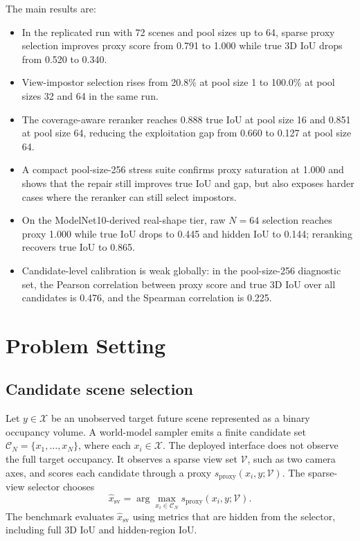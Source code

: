 \documentclass{article}
\newcommand{\vox}{\mathcal{X}}
\newcommand{\views}{\mathcal{V}}
\newcommand{\cand}{\mathcal{C}}
\begin{document}
The main results are:
\begin{itemize}
  \item In the replicated run with 72 scenes and pool sizes up to 64, sparse
  proxy selection improves proxy score from 0.791 to 1.000 while true 3D IoU
  drops from 0.520 to 0.340.
  \item View-impostor selection rises from 20.8\% at pool size 1 to 100.0\% at
  pool sizes 32 and 64 in the same run.
  \item The coverage-aware reranker reaches 0.888 true IoU at pool size 16 and
  0.851 at pool size 64, reducing the exploitation gap from 0.660 to 0.127 at
  pool size 64.
  \item A compact pool-size-256 stress suite confirms proxy saturation at 1.000
  and shows that the repair still improves true IoU and gap, but also exposes
  harder cases where the reranker can still select impostors.
  \item On the ModelNet10-derived real-shape tier, raw $N=64$ selection reaches
  proxy 1.000 while true IoU drops to 0.445 and hidden IoU to 0.144; reranking
  recovers true IoU to 0.865.
  \item Candidate-level calibration is weak globally: in the pool-size-256
  diagnostic set, the Pearson correlation between proxy score and true 3D IoU
  over all candidates is 0.476, and the Spearman correlation is 0.225.
\end{itemize}

\section{Problem Setting}

\subsection{Candidate scene selection}

Let $y \in \vox$ be an unobserved target future scene represented as a binary
occupancy volume. A world-model sampler emits a finite candidate set
$\cand_N=\{x_1,\ldots,x_N\}$, where each $x_i \in \vox$. The deployed interface
does not observe the full target occupancy. It observes a sparse view set
$\views$, such as two camera axes, and scores each candidate through a proxy
$s_{\mathrm{proxy}}(x_i,y;\views)$. The sparse-view selector chooses
\[
\hat{x}_{\mathrm{sv}}=\arg\max_{x_i\in\cand_N}
s_{\mathrm{proxy}}(x_i,y;\views).
\]
The benchmark evaluates $\hat{x}_{\mathrm{sv}}$ using metrics that are hidden
from the selector, including full 3D IoU and hidden-region IoU.
\end{document}
